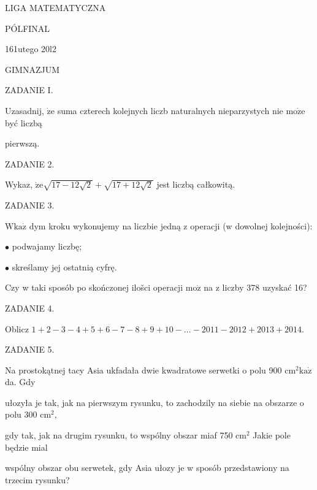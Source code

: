 \documentclass[a4paper,12pt]{article}
\begin{document}
LIGA MATEMATYCZNA

PÓLFINAL

161utego 20l2

GIMNAZJUM

ZADANIE I.

Uzasadnij, $\dot{\mathrm{z}}\mathrm{e}$ suma czterech kolejnych liczb naturalnych nieparzystych nie $\mathrm{m}\mathrm{o}\dot{\mathrm{z}}\mathrm{e}$ być liczbą

pierwszą.

ZADANIE 2.

Wykaz, $\dot{\mathrm{z}}\mathrm{e}\sqrt{17-12\sqrt{2}}+\sqrt{17+12\sqrt{2}}$ jest liczbą całkowitą.

ZADANIE 3.

$\mathrm{W}\mathrm{k}\mathrm{a}\dot{\mathrm{z}}$ dym kroku wykonujemy na liczbie jedną z operacji (w dowolnej kolejności):

$\bullet$ podwajamy liczbę;

$\bullet$ skreślamy jej ostatnią cyfrę.

Czy w taki sposób po skończonej ilošci operacji $\mathrm{m}\mathrm{o}\dot{\mathrm{z}}$ na z liczby 378 uzyskać 16?

ZADANIE 4.

Oblicz $1+2-3-4+5+6-7-8+9+10-\ldots-2011-2012+2013+2014.$

ZADANIE 5.

Na prostokątnej tacy Asia ukfadała dwie kwadratowe serwetki o polu 900 $\mathrm{c}\mathrm{m}^{2} \mathrm{k}\mathrm{a}\dot{\mathrm{z}}$ da. Gdy

ułozyła je tak, jak na pierwszym rysunku, to zachodzily na siebie na obszarze o polu 300 $\mathrm{c}\mathrm{m}^{2},$

gdy tak, jak na drugim rysunku, to wspólny obszar miaf 750 $\mathrm{c}\mathrm{m}^{2}$ Jakie pole będzie mial

wspólny obszar obu serwetek, gdy Asia ułozy je w sposób przedstawiony na trzecim rysunku?
\end{document}
